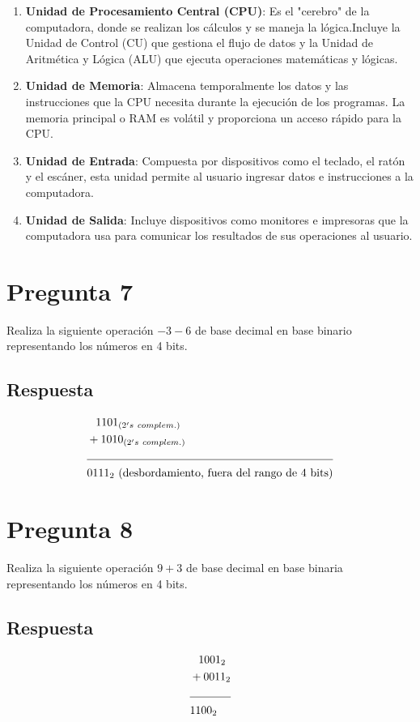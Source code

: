 \documentclass{article}
\begin{document}
\begin{enumerate}
    \item \textbf{Unidad de Procesamiento Central (CPU)}: Es el "cerebro" de la computadora, donde se realizan los cálculos y se maneja la lógica.Incluye la Unidad de Control (CU) que gestiona el flujo de datos y la Unidad de Aritmética y Lógica (ALU) que ejecuta operaciones matemáticas y lógicas.
    
    \item \textbf{Unidad de Memoria}: Almacena temporalmente los datos y las instrucciones que la CPU necesita durante la ejecución de los programas. La memoria principal o RAM es volátil y proporciona un acceso rápido para la CPU.
    
    \item \textbf{Unidad de Entrada}: Compuesta por dispositivos como el teclado, el ratón y el escáner, esta unidad permite al usuario ingresar datos e instrucciones a la computadora.
    
    \item \textbf{Unidad de Salida}: Incluye dispositivos como monitores e impresoras que la computadora usa para comunicar los resultados de sus operaciones al usuario.
\end{enumerate}

\section*{Pregunta 7}
Realiza la siguiente operación \(-3 - 6\) de base decimal en base binario representando los números en 4 bits.
\subsection*{Respuesta}
\begin{align*}
  &\phantom{-}1101_{(2's\ complem.)} \\
  &+1010_{(2's\ complem.)} \\
  \cline{1-2}
  &0111_{2} \text{ (desbordamiento, fuera del rango de 4 bits)}
\end{align*}


\section*{Pregunta 8}
Realiza la siguiente operación \(9 + 3\) de base decimal en base binaria representando los números en 4 bits.
\subsection*{Respuesta}
\begin{align*}
  &\phantom{+}1001_2 \\
  &+0011_2 \\
  \cline{1-2}
  &1100_2
\end{align*}
\end{document}
